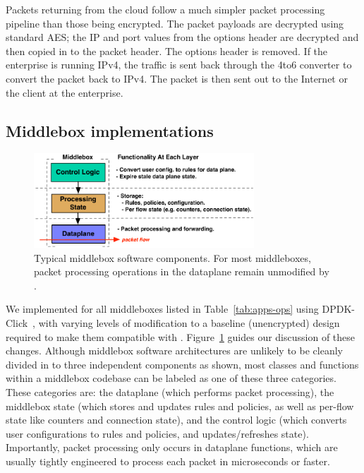  Packets returning from the cloud follow a much simpler packet processing pipeline than those being encrypted.
The packet payloads are decrypted using standard AES; the IP and port values from the options header are decrypted and then copied in to the packet header. The options header is removed.
If the enterprise is running IPv4, the traffic is sent back through the 4to6 converter to convert the packet back to IPv4.
The packet is then sent out to the Internet or the client at the enterprise.


\subsection{Middlebox implementations}
\label{sec:middleboxes}

\begin{figure}[t]
  \includegraphics[width=3.25in]{fig/mbarch}
  \caption[]{\label{fig:mbarch} Typical middlebox software components. For most middleboxes, packet processing operations in the dataplane remain unmodified by \sys.}
\end{figure}

We implemented \sys for all middleboxes listed in Table~\ref{tab:apps-ops} using DPDK-Click~\cite{click}, with varying levels of modification to a baseline (unencrypted) design required to make them compatible with \sys. 
Figure~\ref{fig:mbarch} guides our discussion of these changes. %
Although  middlebox software architectures are unlikely to be cleanly divided in to three independent components as shown, most classes and functions within a middlebox codebase can be labeled as one of these three categories.
These categories are: the dataplane (which performs packet processing), the middlebox state (which stores and updates rules and policies, as well as per-flow state like counters and connection state), and the control logic (which converts user configurations to rules and policies, and updates/refreshes state). 
Importantly, packet processing only occurs in dataplane functions, which are usually tightly engineered to process each packet in microseconds or faster.

